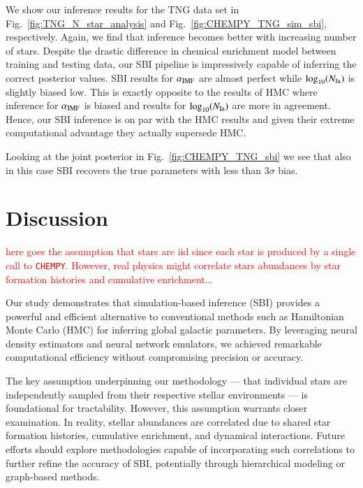 \documentclass{aa}
\begin{document}
We show our inference results for the TNG data set in Fig.~\ref{fig:TNG_N_star_analysis} and Fig.~\ref{fig:CHEMPY_TNG_sim_sbi}, respectively.
Again, we find that inference becomes better with increasing number of stars. Despite the drastic difference in chemical enrichment model between training and testing data, our SBI pipeline is impressively capable of inferring the correct posterior values. SBI results for $\alpha_{\rm IMF}$ are almost perfect while $\log_{10}(N_{\rm Ia})$ is slightly biased low. This is exactly opposite to the results of HMC where inference for $\alpha_{\rm IMF}$ is biased and results for $\log_{10}(N_{\rm Ia})$ are more in agreement. Hence, our SBI inference is on par with the HMC results and given their extreme computational advantage they actually supersede HMC.

Looking at the joint posterior in Fig.~\ref{fig:CHEMPY_TNG_sbi} we see that also in this case SBI recovers the true parameters with less than $3\sigma$ bias.



\section{Discussion}
\label{sec: discussion}

\textcolor{red}{here goes the assumption that stars are iid since each star is produced by a single call to \texttt{CHEMPY}. However, real physics might correlate stars abundances by star formation histories and cumulative enrichment...}

Our study demonstrates that simulation-based inference (SBI) provides a powerful and efficient alternative to conventional methods such as Hamiltonian Monte Carlo (HMC) for inferring global galactic parameters. By leveraging neural density estimators and neural network emulators, we achieved remarkable computational efficiency without compromising precision or accuracy.

The key assumption underpinning our methodology — that individual stars are independently sampled from their respective stellar environments — is foundational for tractability. However, this assumption warrants closer examination. In reality, stellar abundances are correlated due to shared star formation histories, cumulative enrichment, and dynamical interactions. Future efforts should explore methodologies capable of incorporating such correlations to further refine the accuracy of SBI, potentially through hierarchical modeling or graph-based methods.
\end{document}
